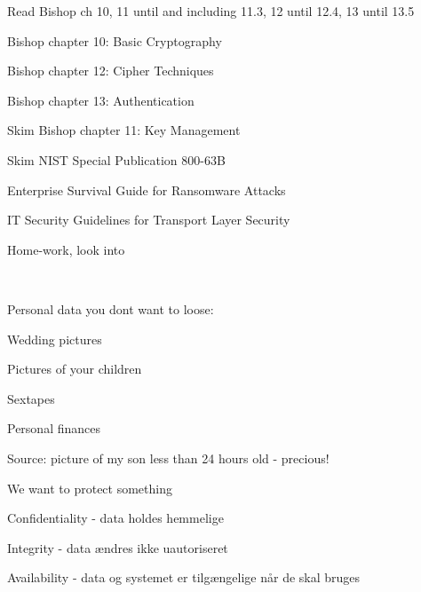 \documentclass[Screen16to9,17pt]{foils}
\begin{document}

\begin{list1}
\item Read Bishop ch 10, 11 until and including 11.3, 12 until 12.4, 13 until 13.5
\item Bishop chapter 10: Basic Cryptography
\item Bishop chapter 12: Cipher Techniques
\item Bishop chapter 13: Authentication
\item Skim Bishop chapter 11: Key Management
\item Skim NIST Special Publication 800-63B
\item Enterprise Survival Guide for Ransomware Attacks
\item IT Security Guidelines for Transport Layer Security
\end{list1}

Home-work, look into {\small  {}}





{~}

\begin{list1}
\item Personal data you dont want to loose:
\begin{list2}
\item Wedding pictures
\item Pictures of your children
\item Sextapes
\item Personal finances
\end{list2}
\end{list1}

Source: picture of my son less than 24 hours old - precious!




\begin{list1}
\item We want to protect something
\item Confidentiality - data holdes hemmelige
\item Integrity - data ændres ikke uautoriseret
\item Availability - data og systemet er tilgængelige når de skal bruges
\end{list1}
\end{document}
